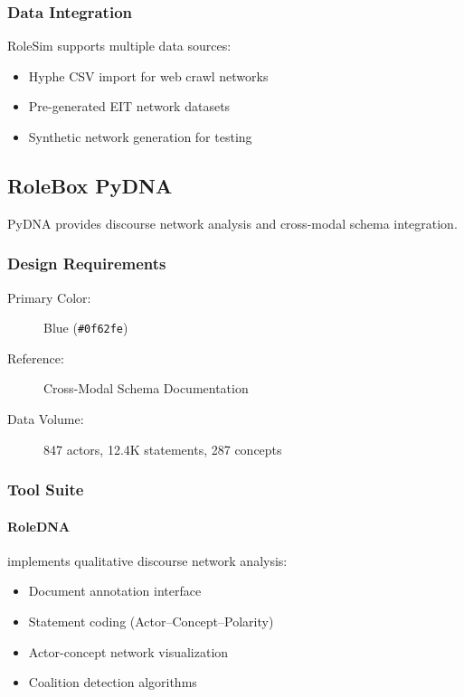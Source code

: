 \subsubsection{Data Integration}

RoleSim supports multiple data sources:
\begin{itemize}
    \item Hyphe CSV import for web crawl networks
    \item Pre-generated EIT network datasets
    \item Synthetic network generation for testing
\end{itemize}

\subsection{RoleBox PyDNA}

PyDNA provides discourse network analysis and cross-modal schema integration.

\subsubsection{Design Requirements}

\begin{description}
    \item[Primary Color:] Blue (\texttt{\#0f62fe})
    \item[Reference:] Cross-Modal Schema Documentation
    \item[Data Volume:] 847 actors, 12.4K statements, 287 concepts
\end{description}

\subsubsection{Tool Suite}

\paragraph{RoleDNA} implements qualitative discourse network analysis:
\begin{itemize}
    \item Document annotation interface
    \item Statement coding (Actor--Concept--Polarity)
    \item Actor-concept network visualization
    \item Coalition detection algorithms
\end{itemize}

